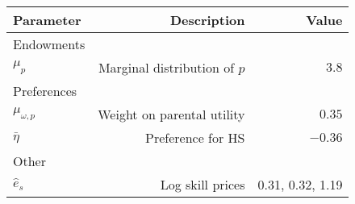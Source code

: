 \begin{tabular}{lrr}
\hline
Parameter & Description  & Value  \\
\hline
Endowments &   &   \\
$\mu_{p}$ & Marginal distribution of $p$  & $3.8$  \\
Preferences &   &   \\
$\mu_{\omega,p}$ & Weight on parental utility  & $0.35$  \\
$\bar{\eta}$ & Preference for HS  & $-0.36$  \\
Other &   &   \\
$\hat{e}_{s}$ & Log skill prices  & 0.31, 0.32, 1.19  \\
\hline
\end{tabular}%
